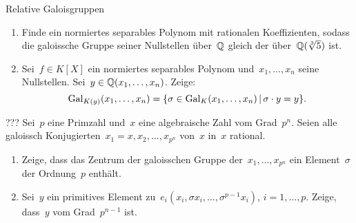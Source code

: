 \documentclass{algblatt}
\begin{document}
\begin{aufgabe}{Relative Galoisgruppen}
\begin{enumerate}
\item Finde ein normiertes separables Polynom mit rationalen Koeffizienten,
sodass die galoissche Gruppe seiner Nullstellen über~$\mathbb{Q}$ gleich der
über~$\mathbb{Q}(\sqrt[3]{5})$ ist.
\item Sei~$f \in K[X]$ ein normiertes separables Polynom und~$x_1,\ldots,x_n$
seine Nullstellen. Sei~$y \in \mathbb{Q}(x_1,\ldots,x_n)$. Zeige:
\[ \mathrm{Gal}_{K(y)}(x_1,\ldots,x_n) = \{ \sigma \in \mathrm{Gal}_K(x_1,\ldots,x_n) \,|\,
\sigma \cdot y = y \}. \]
\end{enumerate}
\end{aufgabe}

\begin{aufgabe}{???}
Sei~$p$ eine Primzahl und~$x$ eine algebraische Zahl vom Grad~$p^n$. Seien alle
galoissch Konjugierten~$x_1 = x, x_2, \ldots, x_{p^n}$ von~$x$ in~$x$ rational.
\begin{enumerate}
\item Zeige, dass das Zentrum der galoisschen Gruppe der~$x_1,\ldots,x_{p^n}$ ein
Element~$\sigma$ der Ordnung~$p$ enthält.
\item Sei~$y$ ein primitives Element zu~$e_i(x_i,\sigma
x_i,\ldots,\sigma^{p-1}x_i)$, $i = 1,\ldots,p$. Zeige, dass~$y$ vom
Grad~$p^{n-1}$ ist.
\end{enumerate}
\end{aufgabe}
\end{document}

